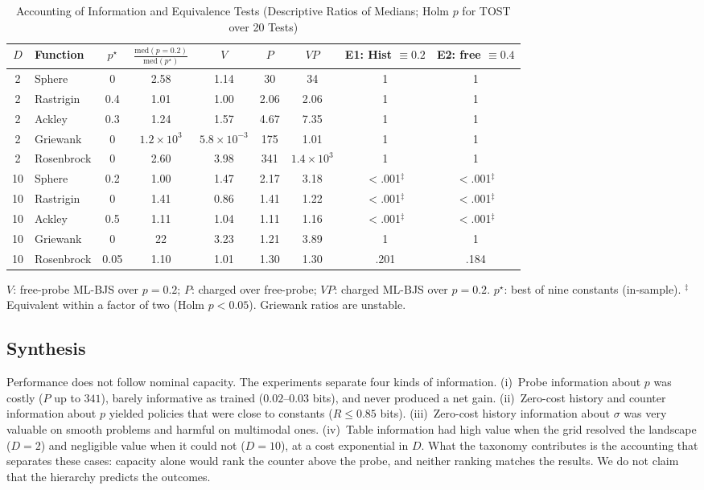 \documentclass[conference]{IEEEtran}
\begin{document}
\begin{table}[t]
\centering
\caption{Accounting of Information and Equivalence Tests (Descriptive Ratios of Medians; Holm $p$ for TOST over 20 Tests)}
\label{tab:value}
\scriptsize
\setlength{\tabcolsep}{3pt}
\begin{tabular}{@{}clccccccc@{}}
\toprule
$D$ & Function & $p^\star$ & $\frac{\mathrm{med}(p{=}0.2)}{\mathrm{med}(p^\star)}$ & $V$ & $P$ & $VP$ & E1: Hist $\equiv0.2$ & E2: free $\equiv0.4$\\
\midrule
2 & Sphere & 0 & 2.58 & 1.14 & 30 & 34 & 1 & 1 \\
2 & Rastrigin & 0.4 & 1.01 & 1.00 & 2.06 & 2.06 & 1 & 1 \\
2 & Ackley & 0.3 & 1.24 & 1.57 & 4.67 & 7.35 & 1 & 1 \\
2 & Griewank & 0 & $1.2\times10^{3}$ & $5.8\times10^{-3}$ & 175 & 1.01 & 1 & 1 \\
2 & Rosenbrock & 0 & 2.60 & 3.98 & 341 & $1.4\times10^{3}$ & 1 & 1 \\
\midrule
10 & Sphere & 0.2 & 1.00 & 1.47 & 2.17 & 3.18 & $<$.001$^\ddagger$ & $<$.001$^\ddagger$ \\
10 & Rastrigin & 0 & 1.41 & 0.86 & 1.41 & 1.22 & $<$.001$^\ddagger$ & $<$.001$^\ddagger$ \\
10 & Ackley & 0.5 & 1.11 & 1.04 & 1.11 & 1.16 & $<$.001$^\ddagger$ & $<$.001$^\ddagger$ \\
10 & Griewank & 0 & 22 & 3.23 & 1.21 & 3.89 & 1 & 1 \\
10 & Rosenbrock & 0.05 & 1.10 & 1.01 & 1.30 & 1.30 & .201 & .184 \\
\bottomrule
\end{tabular}

\smallskip
\footnotesize $V$: free-probe ML-BJS over $p=0.2$; $P$: charged over free-probe; $VP$: charged ML-BJS over $p=0.2$. $p^\star$: best of nine constants (in-sample). $^\ddagger$Equivalent within a factor of two (Holm $p<0.05$). Griewank ratios are unstable.
\end{table}

\subsection{Synthesis}
Performance does not follow nominal capacity. The experiments separate four kinds of information. (i)~Probe information about $p$ was costly ($P$ up to $341$), barely informative as trained ($0.02$--$0.03$ bits), and never produced a net gain. (ii)~Zero-cost history and counter information about $p$ yielded policies that were close to constants ($R\le0.85$ bits). (iii)~Zero-cost history information about $\sigma$ was very valuable on smooth problems and harmful on multimodal ones. (iv)~Table information had high value when the grid resolved the landscape ($D=2$) and negligible value when it could not ($D=10$), at a cost exponential in $D$. What the taxonomy contributes is the accounting that separates these cases: capacity alone would rank the counter above the probe, and neither ranking matches the results. We do not claim that the hierarchy predicts the outcomes.
\end{document}
